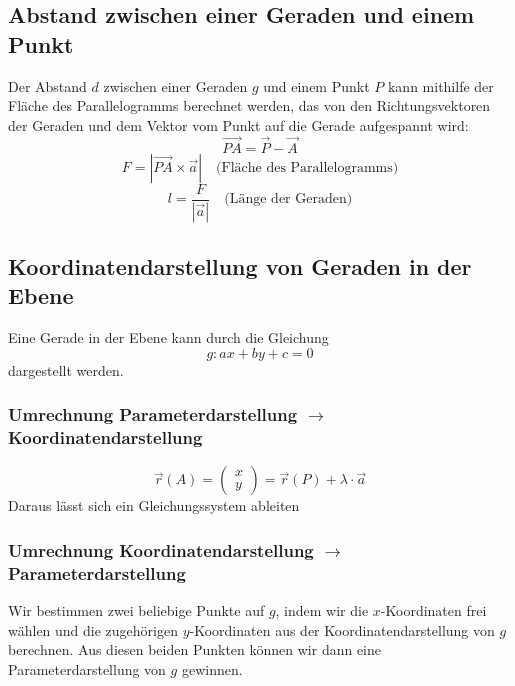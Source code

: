 \documentclass{article}
\begin{document}
\begin{minipage}[t]{0.45\textwidth}
    \subsection*{Abstand zwischen einer Geraden und einem Punkt}
    Der Abstand \( d \) zwischen einer Geraden \( g \) und einem Punkt \( P \) kann mithilfe der Fläche des Parallelogramms berechnet werden, 
    das von den Richtungsvektoren der Geraden und dem Vektor vom Punkt auf die Gerade aufgespannt wird:
    \begin{equation*}
        \overrightarrow{PA} = \vec{P} - \vec{A}
    \end{equation*}
    \begin{equation*}
        F = |\overrightarrow{PA} \times \vec{a}|
        \quad \text{(Fläche des Parallelogramms)}
    \end{equation*}
    \begin{equation*}
        l = \frac{F}{|\vec{a}|}
        \quad \text{(Länge der Geraden)}
    \end{equation*}
\end{minipage}

\begin{minipage}[t]{0.45\textwidth}
    \subsection*{Koordinatendarstellung von Geraden in der Ebene}
    Eine Gerade in der Ebene kann durch die Gleichung
    \begin{equation*}
        g: ax + by + c = 0
    \end{equation*}
    dargestellt werden.
    \subsubsection*{Umrechnung Parameterdarstellung $\to$ Koordinatendarstellung}
    \begin{equation*}
        \vec{r}(A) = \begin{pmatrix}
        x \\
        y
        \end{pmatrix} = \vec{r}(P) + \lambda \cdot \vec{a}
    \end{equation*}
    Daraus lässt sich ein Gleichungssystem ableiten
\end{minipage}
\hfill
\begin{minipage}[t]{0.45\textwidth}
    \subsubsection*{Umrechnung Koordinatendarstellung $\to$ Parameterdarstellung}
    Wir bestimmen zwei beliebige Punkte auf $g$, indem wir die $x$-Koordinaten frei wählen und die
zugehörigen $y$-Koordinaten aus der Koordinatendarstellung von $g$ berechnen. Aus diesen beiden
Punkten können wir dann eine Parameterdarstellung von $g$ gewinnen.
\end{minipage}
\end{document}

